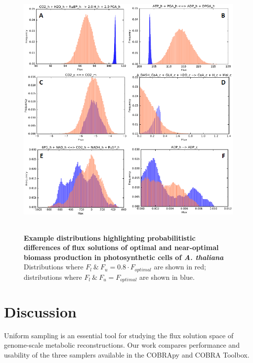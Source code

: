 \documentclass[10pt,letterpaper]{article}
\begin{document}
\begin{figure}
\centering
	\includegraphics[scale=0.62]{ShowDistr.png}\\~\\
	\caption{\textbf{Example distributions highlighting probabilitistic differences of flux solutions of optimal and near-optimal biomass production in photosynthetic cells of \textit{A. thaliana}}
\\ Distributions where $F_l\ \&\ F_u = 0.8\cdot F_{optimal}$ are shown in red; distributions where $F_l\ \&\ F_u = F_{optimal}$ are shown in blue. 
}
\label{figure:ShowDistr}
\end{figure}


\section*{Discussion}
Uniform sampling is an essential tool for studying the flux solution space of genome-scale metabolic reconstructions. Our work compares performance and usability of the three samplers available in the COBRApy and COBRA Toolbox. 
\end{document}
